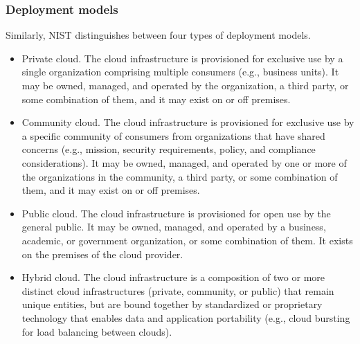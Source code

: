 \subsubsection*{Deployment models}
Similarly, NIST distinguishes between four types of deployment models.\\
\begin{itemize}
	\item Private cloud. 
	The cloud infrastructure is provisioned for exclusive use by a single organization comprising multiple consumers (e.g., business units). It may be owned, managed, and operated by the organization, a third party, or some combination of them, and it may exist on or off premises.
\item Community cloud.
	The cloud infrastructure is provisioned for exclusive use by a specific community of consumers from organizations that have shared concerns (e.g., mission, security requirements, policy, and compliance considerations).
	It may be owned, managed, and operated by one or more of the organizations in the community, a third party, or some combination of them, and it may exist on or off premises.
\item Public cloud.
	The cloud infrastructure is provisioned for open use by the general public. 
	It may be owned, managed, and operated by a business, academic, or government organization, or some combination of them.
	It exists on the premises of the cloud provider.
\item Hybrid cloud. 
	The cloud infrastructure is a composition of two or more distinct cloud infrastructures (private, community, or public) that remain unique entities, but are bound together by standardized or proprietary technology that enables data and application portability (e.g., cloud bursting for load balancing between clouds). 
\end{itemize}

